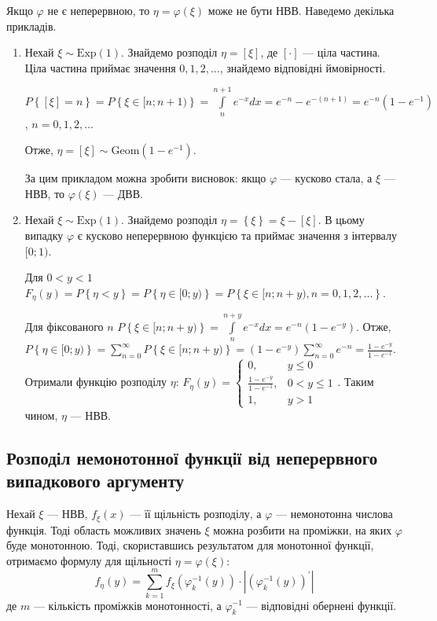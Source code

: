 \begin{remark}
    Якщо $\varphi$ не є неперервною, то $\eta = \varphi(\xi)$ може не бути НВВ. Наведемо декілька прикладів.
    \begin{enumerate}
        \item Нехай $\xi \sim \mathrm{Exp}(1)$. Знайдемо розподіл $\eta = \left[ \xi\right]$, де $\left[ \cdot\right]$ --- ціла частина.
        Ціла частина приймає значення $0, 1, 2, ...$, знайдемо відповідні ймовірності. 
        
        $P\left\{ \left[ \xi\right] = n\right\} = P\left\{ \xi \in [n; n+1)\right\} = \int\limits_n^{n+1} e^{-x} dx = e^{-n} - e^{-(n+1)} = e^{-n}(1 - e^{-1})$, $n = 0, 1, 2, ...$

        Отже, $\eta = \left[ \xi\right] \sim \mathrm{Geom}(1-e^{-1})$.

        За цим прикладом можна зробити висновок: якщо $\varphi$ --- кусково стала, а $\xi$ --- НВВ, то $\varphi(\xi)$ --- ДВВ.
        \item Нехай $\xi \sim \mathrm{Exp}(1)$. Знайдемо розподіл $\eta = \left\{ \xi\right\} = \xi - \left[ \xi\right]$. 
        В цьому випадку $\varphi$ є кусково неперервною функцією та приймає значення з інтервалу $[0; 1)$.
        
        Для $0< y < 1$ $F_\eta (y) = P\left\{\eta < y\right\} = P\left\{\eta \in [0; y)\right\} = P\left\{\xi \in [n; n+y), n = 0, 1, 2, ...\right\}$.

        Для фіксованого $n$ $P\left\{\xi \in [n; n+y)\right\} = \int\limits_n^{n+y} e^{-x} dx = e^{-n}(1 - e^{-y})$. 
        Отже, $P\left\{\eta \in [0; y)\right\} = \sum\limits_{n=0}^{\infty} P\left\{\xi \in [n; n+y)\right\} = (1 - e^{-y}) \sum\limits_{n=0}^{\infty} e^{-n} = \frac{1 - e^{-y}}{1 - e^{-1}}$. Отримали функцію розподілу $\eta$:
        $F_\eta (y) = \begin{cases}
            0, & y \leq 0 \\
            \frac{1 - e^{-y}}{1 - e^{-1}}, & 0 < y \leq 1 \\
            1, & y > 1
        \end{cases}$. Таким чином, $\eta$ --- НВВ.
    \end{enumerate}
\end{remark}

\subsection{Розподіл немонотонної функції від неперервного випадкового аргументу}
Нехай $\xi$ --- НВВ, $f_\xi(x)$ --- її щільність розподілу, а $\varphi$ --- немонотонна числова функція.
Тоді область можливих значень $\xi$ можна розбити на проміжки, на яких $\varphi$ буде монотонною. 
Тоді, скориставшись результатом для монотонної функції, отримаємо формулу для щільності $\eta = \varphi(\xi)$:
$$ f_\eta (y) = \sum\limits_{k=1}^m f_\xi\left(\varphi_k^{-1} (y)\right) \cdot \left|\left(\varphi_k^{-1} (y) \right)^{\prime}\right|$$
де $m$ --- кількість проміжків монотонності, а $\varphi_k^{-1}$ --- відповідні обернені функції.

